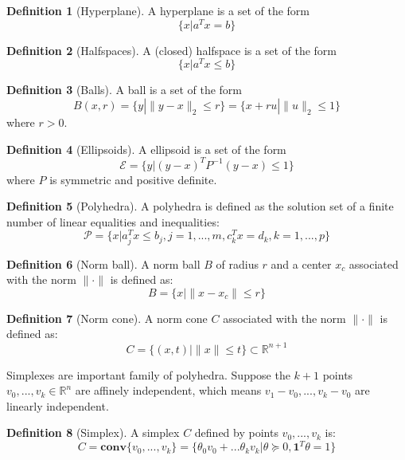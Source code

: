 \documentclass[
]{book}
\theoremstyle{definition}
\newtheorem{definition}{Definition}[chapter]
\theoremstyle{definition}
\theoremstyle{definition}
\theoremstyle{definition}
\theoremstyle{remark}
\begin{document}
\begin{definition}[Hyperplane]
\protect\hypertarget{def:hyperplane}{}\label{def:hyperplane}A hyperplane is a set of the form \[\{x|a^Tx = b\}\]
\end{definition}

\begin{definition}[Halfspaces]
\protect\hypertarget{def:halfspaces}{}\label{def:halfspaces}A (closed) halfspace is a set of the form \[\{x|a^Tx \leq b\}\]
\end{definition}

\begin{definition}[Balls]
\protect\hypertarget{def:balls}{}\label{def:balls}A ball is a set of the form \[B(x,r) = \{y|\|y-x\|_2 \leq r\} = \{x+ru|\|u\|_2\leq 1\}\]
where \(r >0\).
\end{definition}

\begin{definition}[Ellipsoids]
\protect\hypertarget{def:ellipsoids}{}\label{def:ellipsoids}A ellipsoid is a set of the form \[\mathcal{E} = \{y|(y-x)^TP^{-1}(y-x)\leq 1\}\]
where \(P\) is symmetric and positive definite.
\end{definition}

\begin{definition}[Polyhedra]
\protect\hypertarget{def:polyhedra}{}\label{def:polyhedra}A polyhedra is defined as the solution set of a finite number of linear equalities
and inequalities: \[\mathcal{P} = \{x|a_j^Tx\leq b_j, j=1,...,m, c_k^Tx=d_k,k=1,...,p\}\]
\end{definition}

\begin{definition}[Norm ball]
\protect\hypertarget{def:normball}{}\label{def:normball}A norm ball \(B\) of radius \(r\) and a center \(x_c\) associated with the norm \(\|\cdot\|\) is defined as: \[B = \{x|\|x-x_c\|\leq r\}\]
\end{definition}

\begin{definition}[Norm cone]
\protect\hypertarget{def:normcone}{}\label{def:normcone}A norm cone \(C\) associated with the norm \(\|\cdot\|\) is defined as: \[C = \{(x,t)|\|x\|\leq t\}\subset \mathbb{R}^{n+1}\]
\end{definition}

Simplexes are important family of polyhedra. Suppose the \(k+1\) points \(v_0,...,v_k\in \mathbb{R}^n\) are affinely independent, which means \(v_1-v_0,...,v_k-v_0\) are linearly independent.

\begin{definition}[Simplex]
\protect\hypertarget{def:simplex}{}\label{def:simplex}A simplex \(C\) defined by points \(v_0,...,v_k\) is: \[C = \textbf{conv}\{v_0,...,v_k\} = \{\theta_0v_0 + ... \theta_kv_k|\theta \succeq 0, \textbf{1}^T\theta = 1\}\]
\end{definition}
\end{document}
